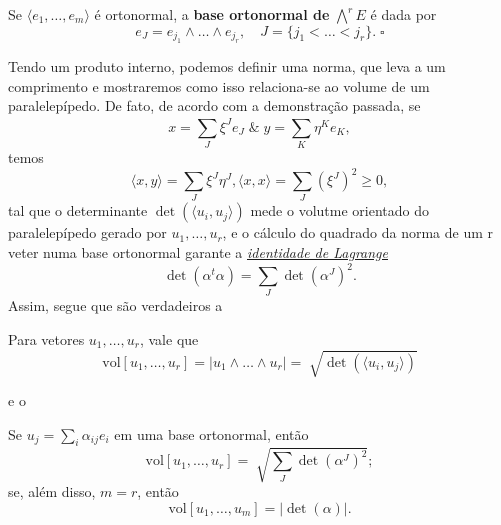 \documentclass[../differential_forms.tex]{subfiles}
\begin{document}
\begin{def*}
	Se \(\langle e_1, \dotsc , e_{m} \rangle\) é ortonormal, a \textbf{base ortonormal de }\(\bigwedge^{r}E\) é dada por
	\[
		e_{J} = e_{j_1}\wedge \dotsc \wedge e_{j_r},\quad J = \{j_1 <\dotsc <j_r\}.\; \square
	\]
\end{def*}

Tendo um produto interno, podemos definir uma norma, que leva a um comprimento e mostraremos como isso relaciona-se ao volume de um paralelepípedo. De fato, de acordo com a demonstração passada, se
\[
	x = \sum\limits_{J}^{}\xi^{J}e_{J}\;\&\; y=\sum\limits_{K}^{}\eta^{K}e_{K},
\]
temos
\[
	\langle x, y \rangle = \sum\limits_{J}^{}\xi^{J}\eta^{J}, \langle x, x \rangle = \sum\limits_{J}^{}(\xi^{J})^{2}\geq 0,
\]
tal que o determinante \(\det{(\langle u_{i}, u_{j} \rangle)} \) mede o volutme orientado do paralelepípedo gerado por \(u_1, \dotsc , u_{r}\), e o cálculo do quadrado da norma de um r veter numa base ortonormal
garante a \hyperlink{lagrange_identity}{\textit{identidade de Lagrange}}
\[
	\det{(\alpha^{t}\alpha )} = \sum\limits_{J}^{}\det{}(\alpha^{J})^{2}.
\]
Assim, segue que são verdadeiros a
\begin{prop*}
	Para vetores \(u_1, \dotsc , u_r\), vale que
	\[
		\mathrm{vol}[u_1, \dotsc , u_r]=| u_1\wedge \dotsc \wedge u_r | = \sqrt[]{\det{(\langle u_{i} , u_{j} \rangle)}}
	\]
\end{prop*}
e o
\begin{crl*}
	Se \(u_{j} = \sum\limits_{i}^{}\alpha_{ij}e_{i}\) em uma base ortonormal, então
	\[
		\mathrm{vol}[u_1, \dotsc , u_r] = \sqrt[]{\sum\limits_{J}^{}\det{(\alpha^{J})^{2}}};
	\]
	se, além disso, \(m=r\), então
	\[
		\mathrm{vol}[u_1, \dotsc , u_m] = | \det{(\alpha )} |.
	\]
\end{crl*}
\end{document}
